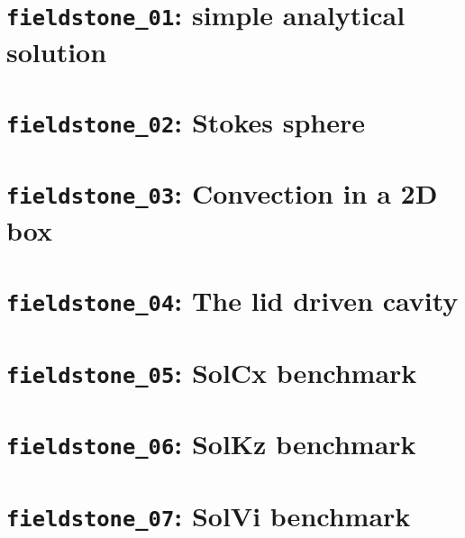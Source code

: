\documentclass[a4paper]{article}
\begin{document}
\section{{\tt fieldstone\_01}: simple analytical solution \label{f01}}


\newpage
\section{{\tt fieldstone\_02}: Stokes sphere \label{f02}}


\newpage
\section{{\tt fieldstone\_03}: Convection in a 2D box \label{f03}}


\newpage
\section{{\tt fieldstone\_04}: The lid driven cavity \label{f04}}



\newpage
\section{{\tt fieldstone\_05}: SolCx benchmark \label{f05}}


\newpage
\section{{\tt fieldstone\_06}: SolKz benchmark \label{f06}}


\newpage
\section{{\tt fieldstone\_07}: SolVi benchmark \label{f07}}

\end{document}
